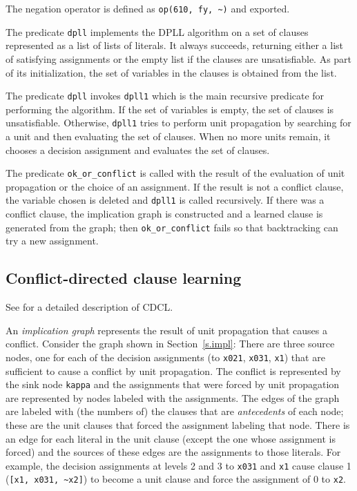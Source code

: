 \documentclass[11pt]{article}
\newcommand*{\p}[1]{\textup{\texttt{#1}}}
\begin{document}
The negation operator is defined as \verb+op(610, fy, ~)+ and exported.

The predicate \p{dpll} implements the DPLL algorithm on a set of clauses
represented as a list of lists of literals. It always succeeds,
returning either a list of satisfying assignments or the empty list if
the clauses are unsatisfiable. As part of its initialization, the set of
variables in the clauses is obtained from the list. 

The predicate \p{dpll} invokes \p{dpll1} which is the main recursive
predicate for performing the algorithm. If the set of variables is
empty, the set of clauses is unsatisfiable. Otherwise, \p{dpll1} tries
to perform unit propagation by searching for a unit and then evaluating
the set of clauses. When no more units remain, it chooses a decision
assignment and evaluates the set of clauses.

The predicate \p{ok\_or\_conflict} is called with the result of the
evaluation of unit propagation or the choice of an assignment. If the
result is not a conflict clause, the variable chosen is deleted and
\p{dpll1} is called recursively. If there was a conflict clause, the
implication graph is constructed and a learned clause is generated from
the graph; then \p{ok\_or\_conflict} fails so that backtracking can try
a new assignment.

\subsection{Conflict-directed clause learning}

See \cite{mlm} for a detailed description of CDCL.

An \emph{implication graph} represents the result of unit propagation
that causes a conflict. Consider the graph shown in
Section~\ref{s.impl}: There are three source nodes, one for each of the
decision assignments (to \p{x021}, \p{x031}, \p{x1}) that are sufficient
to cause a conflict by unit propagation. The conflict is represented by
the sink node \p{kappa} and the assignments that were forced by unit
propagation are represented by nodes labeled with the assignments. The
edges of the graph are labeled with (the numbers of) the clauses that
are \emph{antecedents} of each node; these are the unit clauses that
forced the assignment labeling that node. There is an edge for each
literal in the unit clause (except the one whose assignment is forced)
and the sources of these edges are the assignments to those literals.
For example, the decision assignments at levels 2 and 3 to \p{x031} and
\p{x1} cause clause 1 (\verb+[x1, x031, ~x2]+) to become a unit clause
and force the assignment of 0 to \p{x2}.
\end{document}
